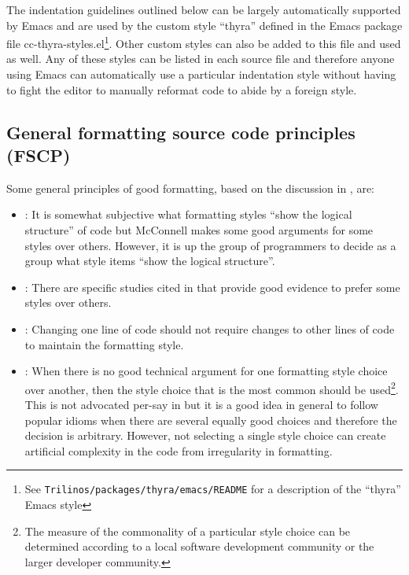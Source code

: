 The indentation guidelines outlined below can be largely automatically
supported by Emacs and are used by the custom style ``thyra'' defined in the
Emacs package file cc-thyra-styles.el\footnote{See
{}\texttt{Trilinos/packages/thyra/emacs/README} for a description of the
``thyra'' Emacs style}.  Other custom styles can also be added to this file
and used as well.  Any of these styles can be listed in each source file and
therefore anyone using Emacs can automatically use a particular indentation
style without having to fight the editor to manually reformat code to abide by
a foreign style.


%
\subsection{General formatting source code principles (FSCP)}
%

Some general principles of good formatting, based on the discussion in
{}\cite[Section 31.1]{CodeComplete2nd04}, are:


\begin{itemize}


{}\item\FSCPShowLogicalStructure: It is somewhat subjective what formatting styles
``show the logical structure'' of code but McConnell makes some good arguments
for some styles over others.  However, it is up the group of programmers to
decide as a group what style items ``show the logical structure''.


{}\item\FSCPImproveReadability: There are specific studies cited in
{}\cite[Chapter 31]{CodeComplete2nd04} that provide good evidence to prefer
some styles over others.


{}\item\FSCPRetainFormatting: Changing one line of code should not
require changes to other lines of code to maintain the formatting
style.


{}\item\FSCPFollowCommonIdioms: When there is no good technical
argument for one formatting style choice over another, then the style
choice that is the most common should be used\footnote{The measure of
the commonality of a particular style choice can be determined
according to a local software development community or the larger
developer community.}.  This is not advocated per-say in
{}\cite[Chapter 31]{CodeComplete2nd04} but it is a good idea in
general to follow popular idioms when there are several equally good
choices and therefore the decision is arbitrary.  However, not
selecting a single style choice can create artificial complexity in
the code from irregularity in formatting.


\end{itemize}


